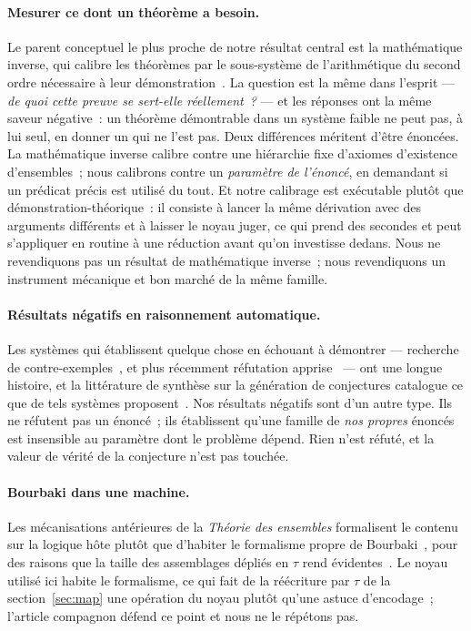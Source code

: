 \documentclass[11pt]{article}
\theoremstyle{remark}\newtheorem{remarque}{Remarque}
\begin{document}
\paragraph{Mesurer ce dont un théorème a besoin.} Le parent conceptuel le plus proche de
notre résultat central est la mathématique inverse, qui calibre les théorèmes par le
sous-système de l'arithmétique du second ordre nécessaire à leur
démonstration~\cite{simpson2009sosoa}. La question est la même dans l'esprit --- \emph{de
quoi cette preuve se sert-elle réellement~?} --- et les réponses ont la même saveur
négative~: un théorème démontrable dans un système faible ne peut pas, à lui seul, en
donner un qui ne l'est pas. Deux différences méritent d'être énoncées. La mathématique
inverse calibre contre une hiérarchie fixe d'axiomes d'existence d'ensembles~; nous
calibrons contre un \emph{paramètre de l'énoncé}, en demandant si un prédicat précis est
utilisé du tout. Et notre calibrage est exécutable plutôt que démonstration-théorique~: il
consiste à lancer la même dérivation avec des arguments différents et à laisser le noyau
juger, ce qui prend des secondes et peut s'appliquer en routine à une réduction avant
qu'on investisse dedans. Nous ne revendiquons pas un résultat de mathématique inverse~;
nous revendiquons un instrument mécanique et bon marché de la même famille.

\paragraph{Résultats négatifs en raisonnement automatique.} Les systèmes qui établissent
quelque chose en échouant à démontrer --- recherche de
contre-exemples~\cite{blanchette2011nitpick}, et plus récemment réfutation
apprise~\cite{learningtodisprove2026} --- ont une longue histoire, et la littérature de
synthèse sur la génération de conjectures catalogue ce que de tels systèmes
proposent~\cite{conjecturingsurvey2026}. Nos résultats négatifs sont d'un autre type. Ils
ne réfutent pas un énoncé~; ils établissent qu'une famille de \emph{nos propres} énoncés
est insensible au paramètre dont le problème dépend. Rien n'est réfuté, et la valeur de
vérité de la conjecture n'est pas touchée.

\paragraph{Bourbaki dans une machine.} Les mécanisations antérieures de la \emph{Théorie
des ensembles} formalisent le contenu sur la logique hôte plutôt que d'habiter le
formalisme propre de Bourbaki~\cite{grimm2010gaia}, pour des raisons que la taille des
assemblages dépliés en $\tau$ rend évidentes~\cite{mathias2002term}. Le noyau utilisé ici
habite le formalisme, ce qui fait de la réécriture par $\tau$ de la
section~\ref{sec:map} une opération du noyau plutôt qu'une astuce d'encodage~; l'article
compagnon défend ce point et nous ne le répétons pas.
\end{document}
